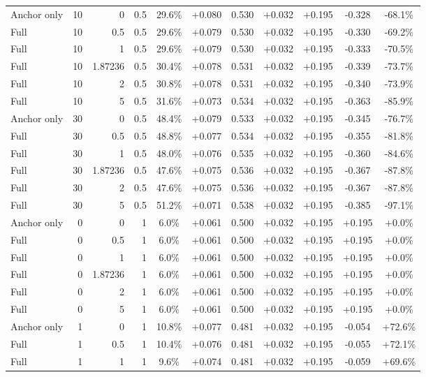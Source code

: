 \begin{table}[htbp]
\begin{tabular}{lrrrccccccc}
Anchor only & 10 & 0 & 0.5 & 29.6\% & +0.080 & 0.530 & +0.032 & +0.195 & -0.328 & -68.1\% \\
Full & 10 & 0.5 & 0.5 & 29.6\% & +0.079 & 0.530 & +0.032 & +0.195 & -0.330 & -69.2\% \\
Full & 10 & 1 & 0.5 & 29.6\% & +0.079 & 0.530 & +0.032 & +0.195 & -0.333 & -70.5\% \\
Full & 10 & 1.87236 & 0.5 & 30.4\% & +0.078 & 0.531 & +0.032 & +0.195 & -0.339 & -73.7\% \\
Full & 10 & 2 & 0.5 & 30.8\% & +0.078 & 0.531 & +0.032 & +0.195 & -0.340 & -73.9\% \\
Full & 10 & 5 & 0.5 & 31.6\% & +0.073 & 0.534 & +0.032 & +0.195 & -0.363 & -85.9\% \\
Anchor only & 30 & 0 & 0.5 & 48.4\% & +0.079 & 0.533 & +0.032 & +0.195 & -0.345 & -76.7\% \\
Full & 30 & 0.5 & 0.5 & 48.8\% & +0.077 & 0.534 & +0.032 & +0.195 & -0.355 & -81.8\% \\
Full & 30 & 1 & 0.5 & 48.0\% & +0.076 & 0.535 & +0.032 & +0.195 & -0.360 & -84.6\% \\
Full & 30 & 1.87236 & 0.5 & 47.6\% & +0.075 & 0.536 & +0.032 & +0.195 & -0.367 & -87.8\% \\
Full & 30 & 2 & 0.5 & 47.6\% & +0.075 & 0.536 & +0.032 & +0.195 & -0.367 & -87.8\% \\
Full & 30 & 5 & 0.5 & 51.2\% & +0.071 & 0.538 & +0.032 & +0.195 & -0.385 & -97.1\% \\
Anchor only & 0 & 0 & 1 & 6.0\% & +0.061 & 0.500 & +0.032 & +0.195 & +0.195 & +0.0\% \\
Full & 0 & 0.5 & 1 & 6.0\% & +0.061 & 0.500 & +0.032 & +0.195 & +0.195 & +0.0\% \\
Full & 0 & 1 & 1 & 6.0\% & +0.061 & 0.500 & +0.032 & +0.195 & +0.195 & +0.0\% \\
Full & 0 & 1.87236 & 1 & 6.0\% & +0.061 & 0.500 & +0.032 & +0.195 & +0.195 & +0.0\% \\
Full & 0 & 2 & 1 & 6.0\% & +0.061 & 0.500 & +0.032 & +0.195 & +0.195 & +0.0\% \\
Full & 0 & 5 & 1 & 6.0\% & +0.061 & 0.500 & +0.032 & +0.195 & +0.195 & +0.0\% \\
Anchor only & 1 & 0 & 1 & 10.8\% & +0.077 & 0.481 & +0.032 & +0.195 & -0.054 & +72.6\% \\
Full & 1 & 0.5 & 1 & 10.4\% & +0.076 & 0.481 & +0.032 & +0.195 & -0.055 & +72.1\% \\
Full & 1 & 1 & 1 & 9.6\% & +0.074 & 0.481 & +0.032 & +0.195 & -0.059 & +69.6\% \\

\end{tabular}
\end{table}
